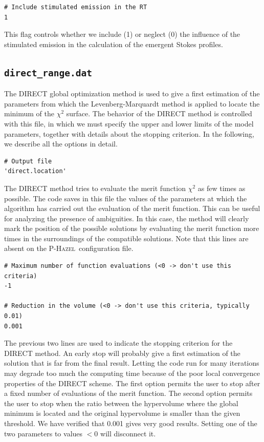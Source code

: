 \documentclass[12pt]{article}
\def\HM{\textsc{P-Hazel}}
\begin{document}
\begin{verbatim}
# Include stimulated emission in the RT
1
\end{verbatim}
This flag controls whether we include (1) or neglect (0) the influence of the stimulated emission 
in the calculation of the emergent Stokes profiles.

\subsection{\texttt{direct\_range.dat}}
\label{sec:direct_range}
The DIRECT global optimization method is used to give a first estimation of the parameters from
which the Levenberg-Marquardt method is applied to locate the minimum of the $\chi^2$ surface.
The behavior of the DIRECT method is controlled with this file, in which we must specify
the upper and lower limits of the model parameters, together with details about the stopping
criterion. In the following, we describe all the options in detail.

\begin{verbatim}
# Output file
'direct.location'
\end{verbatim}
The DIRECT method tries to evaluate the merit function $\chi^2$ as few times as
possible. The code saves in this file the values of the parameters at which
the algorithm has carried out the evaluation of the merit function. This can
be useful for analyzing the presence of ambiguities. In this case, the method
will clearly mark the position of the possible solutions by evaluating the merit
function more times in the surroundings of the compatible solutions.
Note that this lines are absent on the \HM\ configuration file.

\begin{verbatim}
# Maximum number of function evaluations (<0 -> don't use this criteria)
-1

# Reduction in the volume (<0 -> don't use this criteria, typically 0.01)
0.001
\end{verbatim}
The previous two lines are used to indicate the stopping criterion for the
DIRECT method. An early stop will probably give a first estimation of the 
solution that is far from the final result. Letting the code run for many
iterations may degrade too much the computing time because of the poor
local convergence properties of the DIRECT scheme. The first option permits
the user to stop after a fixed number of evaluations of the merit function.
The second option permits
the user to stop when the ratio between the hypervolume where
the global minimum is located and the original hypervolume is smaller than the
given threshold. We have verified that 0.001 gives very good results.
Setting one of the two parameters to values $< 0$ will disconnect it.
\end{document}
